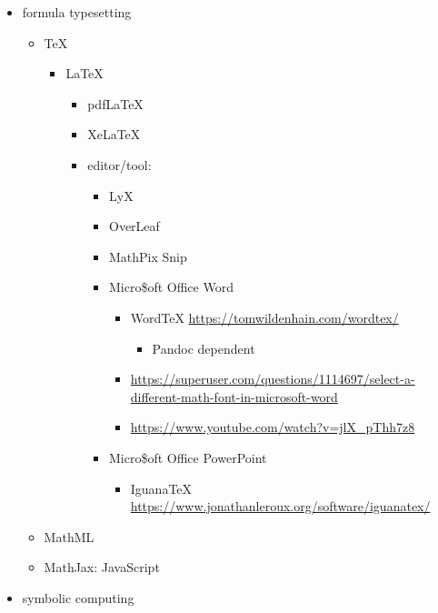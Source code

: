 \documentclass[
]{book}
\providecommand{\tightlist}{%
  \setlength{\itemsep}{0pt}\setlength{\parskip}{0pt}}
\theoremstyle{definition}
\theoremstyle{definition}
\theoremstyle{definition}
\theoremstyle{definition}
\theoremstyle{remark}
\begin{document}
\begin{itemize}
\tightlist
\item
  formula typesetting

  \begin{itemize}
  \tightlist
  \item
    TeX

    \begin{itemize}
    \tightlist
    \item
      LaTeX

      \begin{itemize}
      \tightlist
      \item
        pdfLaTeX
      \item
        XeLaTeX
      \item
        editor/tool:

        \begin{itemize}
        \tightlist
        \item
          LyX
        \item
          OverLeaf
        \item
          MathPix Snip
        \item
          Micro\$oft Office Word

          \begin{itemize}
          \tightlist
          \item
            WordTeX \url{https://tomwildenhain.com/wordtex/}

            \begin{itemize}
            \tightlist
            \item
              Pandoc dependent
            \end{itemize}
          \item
            \url{https://superuser.com/questions/1114697/select-a-different-math-font-in-microsoft-word}
          \item
            \url{https://www.youtube.com/watch?v=jlX_pThh7z8}
          \end{itemize}
        \item
          Micro\$oft Office PowerPoint

          \begin{itemize}
          \tightlist
          \item
            IguanaTeX \url{https://www.jonathanleroux.org/software/iguanatex/}
          \end{itemize}
        \end{itemize}
      \end{itemize}
    \end{itemize}
  \item
    MathML
  \item
    MathJax: JavaScript
  \end{itemize}
\item
  symbolic computing


\end{itemize}
\end{document}
